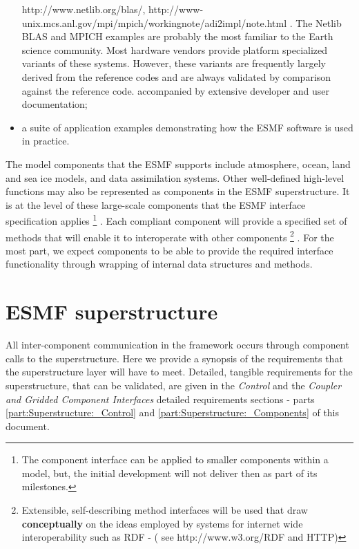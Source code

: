 \begin{itemize}
{http://www.netlib.org/blas/, http://www-unix.mcs.anl.gov/mpi/mpich/workingnote/adi2impl/note.html . The Netlib BLAS and MPICH
examples are probably the most familiar to the Earth science community. Most hardware vendors provide platform specialized variants
of these systems. However, these variants are frequently largely derived from the reference codes and are always validated by
comparison against the reference code.
}
  accompanied by extensive developer and user documentation;
\item a suite of application examples demonstrating how the ESMF
  software is used in practice.
\end{itemize}

The model components that the ESMF supports include atmosphere, ocean,
land and sea ice models, and data assimilation systems. Other
well-defined high-level functions may also be represented as
components in the ESMF superstructure.  It is at the level of these
large-scale components that the ESMF interface specification applies
\footnote{
The component interface can be applied to smaller components within a model,
but, the initial development will not deliver then as part of its milestones.
}
.
Each compliant component will provide a specified set of methods that
will enable it to interoperate with other components \footnote{
Extensible, self-describing method interfaces will be used that draw
{\bf conceptually} on the ideas employed by systems for internet
wide interoperability such as RDF - ( see http://www.w3.org/RDF and HTTP)
}
.  For the most
part, we expect components to be able to provide the required
interface functionality through wrapping of internal data structures
and methods. 

\section{ESMF superstructure}
\label{sec:ESMF_superstructure}

All inter-component communication in the framework occurs through 
component calls to the superstructure. Here we provide a synopsis of the
requirements that the superstructure layer will have to meet.
Detailed, tangible requirements for the superstructure, that can
be validated, are given in the {\it Control} and the {\it Coupler and
Gridded Component Interfaces} detailed requirements sections -
parts \ref{part:Superstructure:_Control} and \ref{part:Superstructure:_Components} of this document. \\

